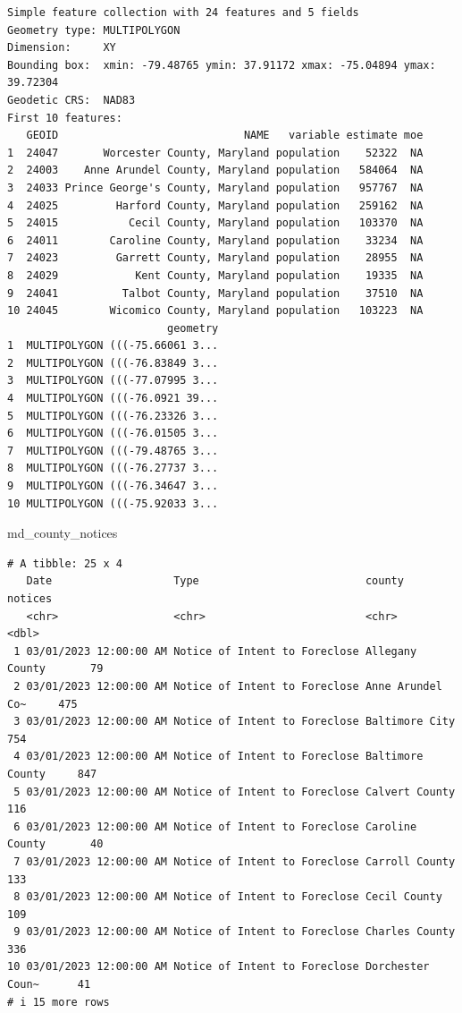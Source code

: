 \documentclass[
  letterpaper,
  DIV=11,
  numbers=noendperiod]{scrreprt}
\newenvironment{Shaded}{\begin{snugshade}}{\end{snugshade}}
\newcommand{\NormalTok}[1]{\textcolor[rgb]{0.00,0.23,0.31}{#1}}
\begin{document}
\begin{verbatim}
Simple feature collection with 24 features and 5 fields
Geometry type: MULTIPOLYGON
Dimension:     XY
Bounding box:  xmin: -79.48765 ymin: 37.91172 xmax: -75.04894 ymax: 39.72304
Geodetic CRS:  NAD83
First 10 features:
   GEOID                             NAME   variable estimate moe
1  24047       Worcester County, Maryland population    52322  NA
2  24003    Anne Arundel County, Maryland population   584064  NA
3  24033 Prince George's County, Maryland population   957767  NA
4  24025         Harford County, Maryland population   259162  NA
5  24015           Cecil County, Maryland population   103370  NA
6  24011        Caroline County, Maryland population    33234  NA
7  24023         Garrett County, Maryland population    28955  NA
8  24029            Kent County, Maryland population    19335  NA
9  24041          Talbot County, Maryland population    37510  NA
10 24045        Wicomico County, Maryland population   103223  NA
                         geometry
1  MULTIPOLYGON (((-75.66061 3...
2  MULTIPOLYGON (((-76.83849 3...
3  MULTIPOLYGON (((-77.07995 3...
4  MULTIPOLYGON (((-76.0921 39...
5  MULTIPOLYGON (((-76.23326 3...
6  MULTIPOLYGON (((-76.01505 3...
7  MULTIPOLYGON (((-79.48765 3...
8  MULTIPOLYGON (((-76.27737 3...
9  MULTIPOLYGON (((-76.34647 3...
10 MULTIPOLYGON (((-75.92033 3...
\end{verbatim}

\begin{Shaded}
\begin{Highlighting}[]
\NormalTok{md\_county\_notices}
\end{Highlighting}
\end{Shaded}

\begin{verbatim}
# A tibble: 25 x 4
   Date                   Type                          county           notices
   <chr>                  <chr>                         <chr>              <dbl>
 1 03/01/2023 12:00:00 AM Notice of Intent to Foreclose Allegany County       79
 2 03/01/2023 12:00:00 AM Notice of Intent to Foreclose Anne Arundel Co~     475
 3 03/01/2023 12:00:00 AM Notice of Intent to Foreclose Baltimore City       754
 4 03/01/2023 12:00:00 AM Notice of Intent to Foreclose Baltimore County     847
 5 03/01/2023 12:00:00 AM Notice of Intent to Foreclose Calvert County       116
 6 03/01/2023 12:00:00 AM Notice of Intent to Foreclose Caroline County       40
 7 03/01/2023 12:00:00 AM Notice of Intent to Foreclose Carroll County       133
 8 03/01/2023 12:00:00 AM Notice of Intent to Foreclose Cecil County         109
 9 03/01/2023 12:00:00 AM Notice of Intent to Foreclose Charles County       336
10 03/01/2023 12:00:00 AM Notice of Intent to Foreclose Dorchester Coun~      41
# i 15 more rows
\end{verbatim}
\end{document}
